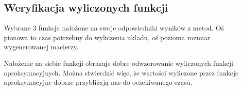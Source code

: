 \documentclass[8pt]{article}
\begin{document}
\subsection*{Weryfikacja wyliczonych funkcji}
Wybrane 3 funkcje nałożone na swoje odpowiedniki wyników z metod. Oś pionowa to czas potrzebny do wyliczenia układu, oś pozioma rozmiar wygenerowanej macierzy.


\begin{center}
\end{center}

Nałożenie na siebie funkcji obrazuje dobre odwzorowanie wyliczonych funkcji aproksymacyjnych. Można stwierdzić więc, że wartości wyliczone przez funkcje aproksymacyjne dobrze przybliżają nas do oczekiwanego czasu.
\end{document}
